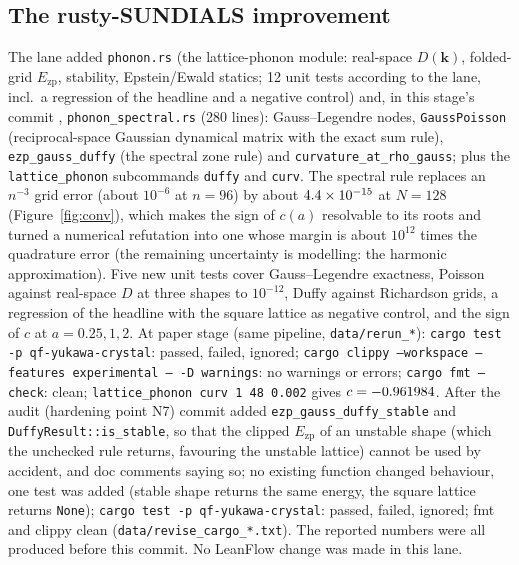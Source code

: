 \documentclass[10pt]{article}
\newcommand{\Ezp}{E_{\mathrm{zp}}}
\begin{document}
\subsection{The rusty-SUNDIALS improvement}
The lane added \texttt{phonon.rs} (the lattice-phonon module: real-space $D(\mathbf k)$, folded-grid $\Ezp$, stability, Epstein/Ewald statics; 12 unit tests according to the lane, incl.\ a regression of the headline and a negative control) and, in this stage's commit \texttt{\ZPRustySpectralShort}, \texttt{phonon\_spectral.rs}
(280 lines): Gauss--Legendre nodes, \texttt{GaussPoisson} (reciprocal-space Gaussian dynamical matrix with the exact sum rule), \texttt{ezp\_gauss\_duffy} (the spectral zone rule) and \texttt{curvature\_at\_rho\_gauss}; plus the \texttt{lattice\_phonon} subcommands
\texttt{duffy} and \texttt{curv}. The spectral rule replaces an $n^{-3}$ grid error (about $10^{-6}$ at $n=96$) by about $4.4\times10^{-15}$ at $N=128$ (Figure~\ref{fig:conv}), which makes the sign of $c(a)$ resolvable to its roots and
turned a numerical refutation into one whose margin is about $10^{12}$ times the quadrature error (the remaining uncertainty is modelling: the harmonic approximation). Five new unit tests cover Gauss--Legendre exactness, Poisson against real-space $D$ at three shapes to $10^{-12}$, Duffy against Richardson grids, a regression of the
headline with the square lattice as negative control, and the sign of $c$ at $a=0.25,1,2$. At paper stage (same pipeline, \texttt{data/rerun\_*}): \texttt{cargo test -p qf-yukawa-crystal}: \ZPCargoPassed{} passed, \ZPCargoFailed{} failed, \ZPCargoIgnored{} ignored;
\texttt{cargo clippy --workspace --features experimental -- -D warnings}: no warnings or errors; \texttt{cargo fmt --check}: clean; \texttt{lattice\_phonon curv 1 48 0.002} gives $c=-0.961984$. After the audit (hardening point N7) commit \texttt{\ZPRustyHardenShort} added \texttt{ezp\_gauss\_duffy\_stable} and \texttt{DuffyResult::is\_stable}, so that the clipped $\Ezp$ of an unstable shape (which the unchecked rule returns, favouring the unstable lattice) cannot be used by accident,
and doc comments saying so; no existing function changed behaviour, one test was added (stable shape returns the same energy, the square lattice returns \texttt{None}); \texttt{cargo test -p qf-yukawa-crystal}: \ZPReviseCargoPassed{} passed, \ZPReviseCargoFailed{} failed, \ZPReviseCargoIgnored{} ignored; fmt and clippy clean (\texttt{data/revise\_cargo\_*.txt}). The reported numbers were all produced before this commit. No LeanFlow change was made in this lane.
\end{document}
